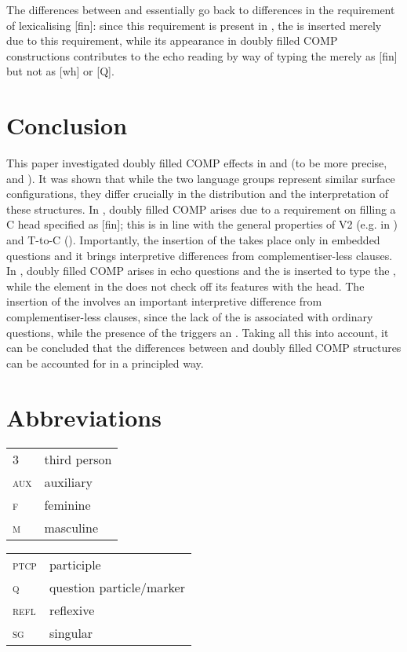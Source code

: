 \documentclass[output=paper,modfonts, hidelinks, newtxmath]{langscibook}
\begin{document}
The differences between  and  essentially go back to differences in the requirement of lexicalising [fin]: since this requirement is present in , the  is inserted merely due to this requirement, while its appearance in  doubly filled COMP constructions contributes to the echo reading by way of typing the  merely as [fin] but not as [wh] or [Q].

\section{Conclusion}
This paper investigated doubly filled COMP effects in  and  (to be more precise,  and ). It was shown that while the two language groups represent similar surface configurations, they differ crucially in the distribution and the interpretation of these structures. In , doubly filled COMP arises due to a requirement on filling a C head specified as [fin]; this is in line with the general properties of V2 (e.g. in ) and T-to-C (). Importantly, the insertion of the  takes place only in embedded questions and it brings interpretive differences from complementiser-less clauses. In , doubly filled COMP arises in echo questions and the  is inserted to type the , while the element in the  does not check off its features with the head. The insertion of the  involves an important interpretive difference from complementiser-less clauses, since the lack of the  is associated with ordinary questions, while the presence of the  triggers an . Taking all this into account, it can be concluded that the differences between  and  doubly filled COMP structures can be accounted for in a principled way.

\section*{Abbreviations}

\begin{tabularx}{.5\textwidth}{@{}lQ@{}}
3&third person\\
\textsc{aux}&auxiliary\\
\textsc{f}&{feminine}\\
\textsc{m}&{masculine}\\
\end{tabularx}%
\begin{tabularx}{.5\textwidth}{@{}lQ@{}}
\textsc{ptcp}&{participle}\\
\textsc{q}&question particle/marker\\
\textsc{refl}&reflexive\\
\textsc{sg}&singular\\
\end{tabularx}
\end{document}
